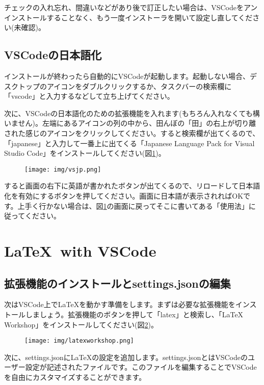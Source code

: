 チェックの入れ忘れ、間違いなどがあり後で訂正したい場合は、VSCodeをアンインストールすることなく、もう一度インストーラを開いて設定し直してください(未確認)。

\subsection{VSCodeの日本語化}
インストールが終わったら自動的にVSCodeが起動します。起動しない場合、デスクトップのアイコンをダブルクリックするか、タスクバーの検索欄に「vscode」と入力するなどして立ち上げてください。

次に、VSCodeの日本語化のための拡張機能を入れます(もちろん入れなくても構いません)。左端にあるアイコンの列の中から、田んぼの「田」の右上が切り離された感じのアイコンをクリックしてください。すると検索欄が出てくるので、「japanese」と入力して一番上に出てくる「Japanese Language Pack for Visual Studio Code」をインストールしてください(図\ref{fig:vsjp})。
\begin{figure}[H]
    \centering
    \texttt{[image: img/vsjp.png]}
    \caption{}
    \label{fig:vsjp}
\end{figure}
すると画面の右下に英語が書かれたボタンが出てくるので、リロードして日本語化を有効にするボタンを押してください。画面に日本語が表示されればOKです。上手く行かない場合は、図\ref{fig:vsjp}の画面に戻ってそこに書いてある「使用法」に従ってください。

\section{\LaTeX \ with VSCode}\label{sec:vslatex}
\subsection{拡張機能のインストールとsettings.jsonの編集}\label{subsec:latexworkshop}
次はVSCode上で\LaTeX を動かす準備をします。まずは必要な拡張機能をインストールしましょう。拡張機能のボタンを押して「latex」と検索し、「LaTeX Workshop」をインストールしてください(図\ref{fig:latexworkshop})。

\begin{figure}[H]
    \centering
    \texttt{[image: img/latexworkshop.png]}
    \caption{}
    \label{fig:latexworkshop}
\end{figure}

次に、settings.jsonにLaTeXの設定を追加します。settings.jsonとはVSCodeのユーザー設定が記述されたファイルです。このファイルを編集することでVSCodeを自由にカスタマイズすることができます。

